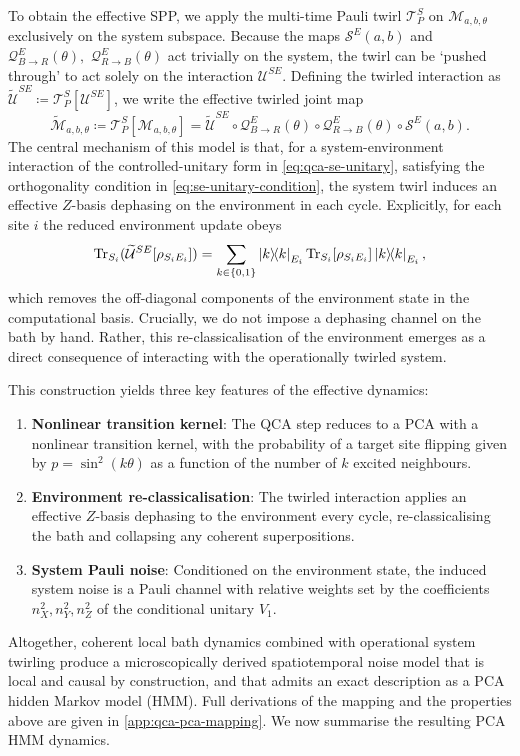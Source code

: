 To obtain the effective SPP, we apply the multi-time Pauli twirl \(\mathcal{T}_P^S\) on \(\mathcal{M}_{a, b, \theta}\) exclusively on the system subspace. Because the maps \(\mathcal{S}^E (a, b)\) and \(\mathcal{Q}_{B\to R}^E(\theta),\) \(\mathcal{Q}_{R\to B}^E(\theta)\) act trivially on the system, the twirl can be `pushed through' to act solely on the interaction \(\mathcal{U}^{SE}\). Defining the twirled interaction as \(\widetilde{\mathcal{U}}^{SE} \coloneq \mathcal{T}_P^S[\mathcal{U}^{SE}]\), we write the effective twirled joint map
\begin{equation}
    \widetilde{\mathcal{M}}_{a, b, \theta} \coloneq \mathcal{T}_P^S[\mathcal{M}_{a, b, \theta}] = \widetilde{\mathcal{U}}^{SE} \circ \mathcal{Q}_{B\to R}^E(\theta) \circ \mathcal{Q}_{R\to B}^E(\theta) \circ \mathcal{S}^E (a, b).
\end{equation}
The central mechanism of this model is that, for a system-environment interaction of the controlled-unitary form in \cref{eq:qca-se-unitary}, satisfying the orthogonality condition in \cref{eq:se-unitary-condition}, the system twirl induces an effective \(Z\)-basis dephasing on the environment in each cycle. Explicitly, for each site \(i\) the reduced environment update obeys
\begin{equation}\label{eq:reduced-environment-update}
    \mathrm{Tr}_{S_i}(\widetilde{\mathcal{U}}^{SE}[\rho_{S_iE_i}]) = \sum_{k\in\{0,1\}} \ket{k}\!\!\bra{k}_{E_i} \mathrm{Tr}_{S_i}[\rho_{S_iE_i}] \ket{k}\!\!\bra{k}_{E_i},
\end{equation}
which removes the off-diagonal components of the environment state in the computational basis. Crucially, we do not impose a dephasing channel on the bath by hand. Rather, this re-classicalisation of the environment emerges as a direct consequence of interacting with the operationally twirled system.

This construction yields three key features of the effective dynamics:
\begin{enumerate}
    \item \textbf{Nonlinear transition kernel}: The QCA step reduces to a PCA with a nonlinear transition kernel, with the probability of a target site flipping given by \(p = \sin^2(k\theta)\) as a function of the number of \(k\) excited neighbours.
    \item \textbf{Environment re-classicalisation}: The twirled interaction applies an effective \(Z\)-basis dephasing to the environment every cycle, re-classicalising the bath and collapsing any coherent superpositions.
    \item \textbf{System Pauli noise}: Conditioned on the environment state, the induced system noise is a Pauli channel with relative weights set by the coefficients \(n_X^2, n_Y^2, n_Z^2\) of the conditional unitary \(V_1\).
\end{enumerate}
Altogether, coherent local bath dynamics combined with operational system twirling produce a microscopically derived spatiotemporal noise model that is local and causal by construction, and that admits an exact description as a PCA hidden Markov model (HMM).
Full derivations of the mapping and the properties above are given in \cref{app:qca-pca-mapping}. We now summarise the resulting PCA HMM dynamics.

